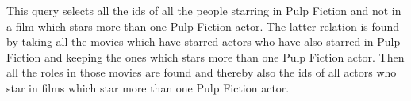 This query selects all the ids of all the people starring in Pulp Fiction and not in a film which stars more than one Pulp Fiction actor. The latter relation is found by taking all the movies which have starred actors who have also starred in Pulp Fiction and keeping the ones which stars more than one Pulp Fiction actor. Then all the roles in those movies are found and thereby also the ids of all actors who star in films which star more than one Pulp Fiction actor.